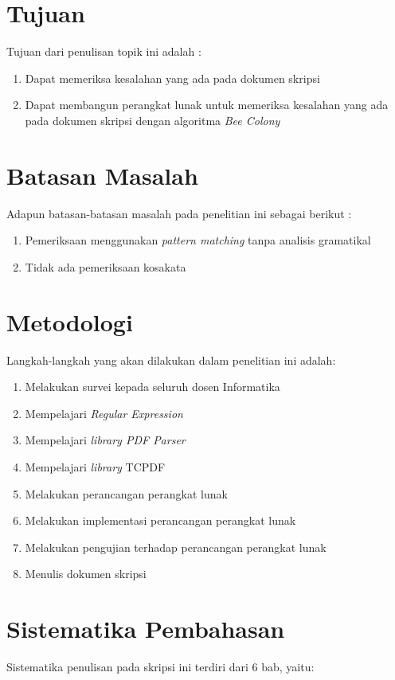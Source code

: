 \section{Tujuan}
\label{sec:tujuan}
Tujuan dari penulisan topik ini adalah :
\begin{enumerate}
	\item Dapat memeriksa kesalahan yang ada pada dokumen skripsi
	\item Dapat membangun perangkat lunak untuk memeriksa kesalahan yang ada pada dokumen skripsi
dengan algoritma \textit{Bee Colony}
\end{enumerate}

\section{Batasan Masalah}
\label{sec:batasan}
Adapun batasan-batasan masalah pada penelitian ini sebagai berikut :
\begin{enumerate}
	\item Pemeriksaan menggunakan \textit{pattern matching} tanpa analisis gramatikal
	\item Tidak ada pemeriksaan kosakata
\end{enumerate}

\section{Metodologi}
\label{sec:metlit}
Langkah-langkah yang akan dilakukan dalam penelitian ini adalah:
\begin{enumerate}
	\item Melakukan survei kepada seluruh dosen Informatika
	\item Mempelajari \textit{Regular Expression}	
	\item Mempelajari \textit{library PDF Parser}
	\item Mempelajari \textit{library} TCPDF
	\item Melakukan perancangan perangkat lunak
	\item Melakukan implementasi perancangan perangkat lunak
	\item Melakukan pengujian terhadap perancangan perangkat lunak
	\item Menulis dokumen skripsi
\end{enumerate}

\section{Sistematika Pembahasan}
\label{sec:sispem}
Sistematika penulisan pada skripsi ini terdiri dari 6 bab, yaitu:

